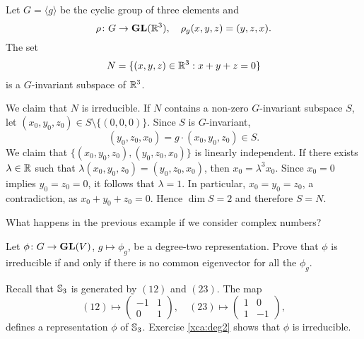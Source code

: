 \begin{example}
Let $G=\langle g\rangle$ be the cyclic group of three elements and 
\[
\rho\colon G\to\mathbf{GL}(\mathbb{R}^3),\quad
\rho_g(x,y,z)=(y,z,x).
\]
The set 
\[
N=\{(x,y,z)\in\mathbb{R}^{3}:x+y+z=0\}
\]
is a $G$-invariant subspace of $\mathbb{R}^3$. 

We claim that $N$ is irreducible. 
If $N$ contains a non-zero $G$-invariant subspace $S$, 
let $(x_0,y_0,z_0)\in S\setminus\{(0,0,0)\}$. Since $S$ is $G$-invariant, 
\[
(y_0,z_0,x_0)=g\cdot (x_0,y_0,z_0)\in S. 
\]
We claim that $\{(x_0,y_0,z_0),(y_0,z_0,x_0)\}$ is linearly independent. If there exists $\lambda\in\mathbb{R}$ 
such that $\lambda(x_0,y_0,z_0)=(y_0,z_0,x_0)$, then $x_0=\lambda^3 x_0$. Since $x_0=0$ implies 
$y_0=z_0=0$, it follows that $\lambda=1$. In particular, $x_0=y_0=z_0$, a contradiction, as $x_0+y_0+z_0=0$. 
Hence $\dim S=2$ and therefore $S=N$. 
\end{example}

What happens in the previous example if we consider complex numbers?

\begin{exercise}
  \label{xca:deg2}
  Let $\phi\colon G\to \mathbf{GL}(V)$, $g\mapsto\phi_g$, be a degree-two representation. Prove that
  $\phi$ is irreducible if and only if there is no common eigenvector for all the $\phi_g$.
\end{exercise}

\begin{example}
\label{exa:S3_deg2}
  Recall that $\mathbb{S}_3$ is generated by $(12)$ and $(23)$. The map 
  \[(12)\mapsto\begin{pmatrix}
    -1 & 1\\
    0 & 1
  \end{pmatrix},
  \quad
  (23)\mapsto\begin{pmatrix}
    1 & 0\\
    1 & -1
  \end{pmatrix},
  \]
  defines a representation $\phi$ of $\mathbb{S}_3$. 
  Exercise \ref{xca:deg2} shows that $\phi$ is  
  irreducible.
\end{example}
